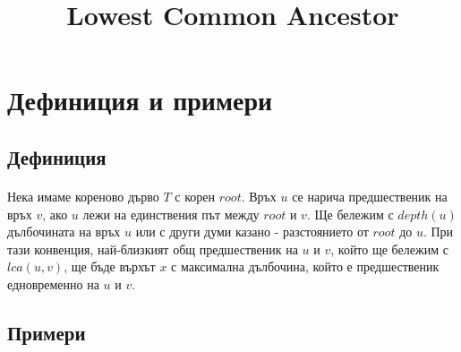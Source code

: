 \documentclass[12pt]{article}
\begin{document}
\title{Lowest Common Ancestor}
\date{}
\maketitle

\section*{Дефиниция и примери}
\subsection*{Дефиниция}
\paragraph*{}
Нека имаме кореново дърво $T$ с корен $root$. Връх $u$ се нарича предшественик на връх $v$, ако $u$ лежи на единствения път между $root$ и $v$. Ще бележим с $depth(u)$ дълбочината на връх $u$ или с други думи казано - разстоянието от $root$ до $u$. При тази конвенция, най-близкият общ предшественик на $u$ и $v$, който ще бележим с $lca(u, v)$, ще бъде върхът $x$ с максимална дълбочина, който е предшественик едновременно на $u$ и $v$. 
\subsection*{Примери}
\paragraph*{}
\end{document}
